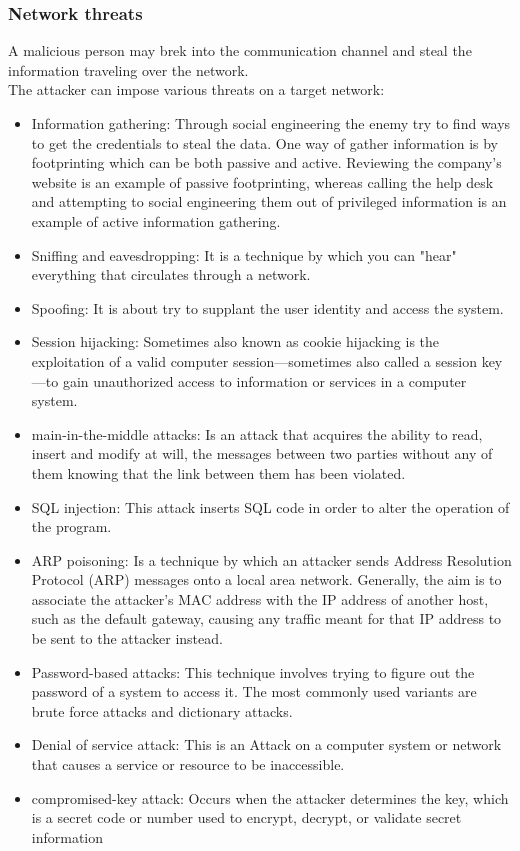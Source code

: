 \subsubsection{Network threats}
A malicious person may brek into the communication channel and steal the information traveling over the network.\\
The attacker can impose various threats on a target network:
\begin{itemize}
	\item Information gathering: Through social engineering the enemy try to find ways to get the credentials to steal the data. One way of gather information is by footprinting which can be both passive and active. Reviewing the company's website is an example of passive footprinting, whereas calling the help desk and attempting to social engineering them out of privileged information is an example of active information gathering.\cite{Hacking3}
	\item Sniffing and eavesdropping: It is a technique by which you can "hear" everything that circulates through a network.
	\item Spoofing: It is about try to supplant the user identity and access the system.
	\item Session hijacking: Sometimes also known as cookie hijacking is the exploitation of a valid computer session—sometimes also called a session key—to gain unauthorized access to information or services in a computer system.
	\item main-in-the-middle attacks: Is an attack that acquires the ability to read, insert and modify at will, the messages between two parties without any of them knowing that the link between them has been violated.
	\item SQL injection: This attack inserts SQL code in order to alter the operation of the program.
	\item ARP poisoning: Is a technique by which an attacker sends Address Resolution Protocol (ARP) messages onto a local area network. Generally, the aim is to associate the attacker's MAC address with the IP address of another host, such as the default gateway, causing any traffic meant for that IP address to be sent to the attacker instead.
	\item Password-based attacks: This technique involves trying to figure out the password of a system to access it. The most commonly used variants are brute force attacks and dictionary attacks.
	\item Denial of service attack: This is an Attack on a computer system or network that causes a service or resource to be inaccessible.
	\item compromised-key attack: Occurs when the attacker determines the key, which is a secret code or number used to encrypt, decrypt, or validate secret information
\end{itemize}

